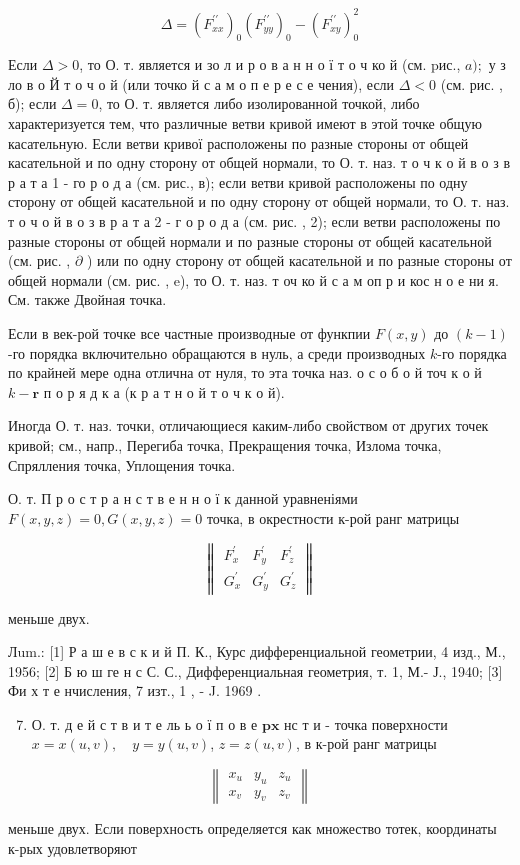 \documentclass[10pt]{article}
\begin{document}
\[
\Delta=\left(F_{x x}^{\prime \prime}\right)_{0}\left(F_{y y}^{\prime \prime}\right)_{0}-\left(F_{x y}^{\prime \prime}\right)_{0}^{2}
\]

Если $\Delta>0$, то О. т. является и зо л и р о в а н н о ї т о ч ко й (см. pис., $a) ;$ у з ло в о Й т о ч о й (или точко й с а м о п е р е с е чения), если $\Delta<0$ (см. рис. , б); если $\Delta=0$, то О. т. является либо изолированной точкой, либо характеризуется тем, что различные ветви кривой имеют в этой точке общую касательную. Если ветви кривої расположены по разные стороны от общей касательной и по одну сторону от общей нормали, то О. т. наз. т о ч к о й в о з в р а т а 1 - го р о д а (см. рис., в); если ветви кривой расположены по одну сторону от общей касательной и по одну сторону от общей нормали, то О. т. наз. т о ч о й в о з в р а т а 2 - г о р о д а (см. рис. , 2); если ветви расположены по разные стороны от общей нормали и по разные стороны от общей касательной (см. рис. , $\partial$ ) или по одну сторону от общей касательной и по разные стороны от общей нормали (см. рис. , e), то О. т. наз. т оч ко й с а м оп р и кос н о е ни я. См. также Двойная точка.

Если в век-рой точке все частные производные от функпии $F(x, y)$ до $(k-1)$-го порядка включительно обращаются в нуль, а среди производных $k$-го порядка по крайней мере одна отлична от нуля, то эта точка наз. о с о б о й точ к о й $k-\mathbf{r}$ п о р я д к а (к р а т н о й т $о$ ч к о й).

Иногда О. т. наз. точки, отличающиеся каким-либо свойством от других точек кривой; см., напр., Перегиба точка, Прекращения точка, Излома точка, Спрялления точка, Уплощения точка.

О. т. П р о с т р а н с т в е н н о ї к данной уравненіями $F(x, y, z)=0, G(x, y, z)=0$ точка, в окрестности к-рой ранг матрицы

\[
\left\|\begin{array}{lll}
F_{x}^{\prime} & F_{y}^{\prime} & F_{z}^{\prime} \\
G_{x}^{\prime} & G_{y}^{\prime} & G_{z}^{\prime}
\end{array}\right\|
\]

меньше двух.

Лum.: [1] Р а ш е в с к и й П. К., Курс дифференциальной геометрии, 4 изд., М., 1956; [2] Б ю ш ге н с С. С., Дифференциальная геометрия, т. 1, М.- Ј., 1940; [3] Фи х т е нчисления, 7 изт., 1 , - J. 1969 .

\begin{enumerate}
  \setcounter{enumi}{6}
  \item О. т. д е й с т в и т е ль ь о ї п о в е $\mathbf{p} \mathbf{x}$ нс т и - точка поверхности $x=x(u, v), \quad y=y(u, v)$, $z=z(u, v)$, в к-рой ранг матрицы
\end{enumerate}

\[
\left\|\begin{array}{lll}
x_{u} & y_{u} & z_{u} \\
x_{v} & y_{v} & z_{v}
\end{array}\right\|
\]

меньше двух. Если поверхность определяется как множество тотек, координаты к-рых удовлетворяют
\end{document}

